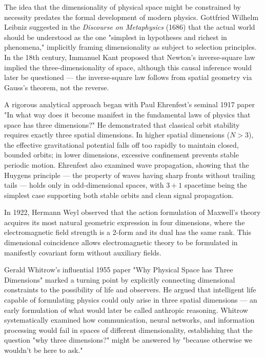 \begin{historical}
    The idea that the dimensionality of physical space might be constrained by necessity predates the formal development of modern physics. Gottfried Wilhelm Leibniz suggested in the \emph{Discourse on Metaphysics} (1686) that the actual world should be understood as the one "simplest in hypotheses and richest in phenomena," implicitly framing dimensionality as subject to selection principles. In the 18th century, Immanuel Kant proposed that Newton's inverse-square law implied the three-dimensionality of space, although this causal inference would later be questioned — the inverse-square law follows from spatial geometry via Gauss's theorem, not the reverse.
    
    A rigorous analytical approach began with Paul Ehrenfest's seminal 1917 paper "In what way does it become manifest in the fundamental laws of physics that space has three dimensions?" He demonstrated that classical orbit stability requires exactly three spatial dimensions. In higher spatial dimensions ($N > 3$), the effective gravitational potential falls off too rapidly to maintain closed, bounded orbits; in lower dimensions, excessive confinement prevents stable periodic motion. Ehrenfest also examined wave propagation, showing that the Huygens principle — the property of waves having sharp fronts without trailing tails — holds only in odd-dimensional spaces, with $3+1$ spacetime being the simplest case supporting both stable orbits and clean signal propagation.
    
    In 1922, Hermann Weyl observed that the action formulation of Maxwell's theory acquires its most natural geometric expression in four dimensions, where the electromagnetic field strength is a 2-form and its dual has the same rank. This dimensional coincidence allows electromagnetic theory to be formulated in manifestly covariant form without auxiliary fields.
    
    Gerald Whitrow's influential 1955 paper "Why Physical Space has Three Dimensions" marked a turning point by explicitly connecting dimensional constraints to the possibility of life and observers. He argued that intelligent life capable of formulating physics could only arise in three spatial dimensions — an early formulation of what would later be called anthropic reasoning. Whitrow systematically examined how communication, neural networks, and information processing would fail in spaces of different dimensionality, establishing that the question "why three dimensions?" might be answered by "because otherwise we wouldn't be here to ask."
    

\end{historical}
